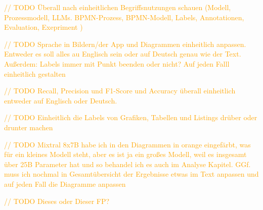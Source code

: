 \textcolor{orange}{// TODO Überall nach einheitlichen Begriffsnutzungen schauen (Modell, Prozessmodell, LLMs. BPMN-Prozess, BPMN-Modell, Labels, Annotationen, Evaluation, Exepriment )}

\textcolor{orange}{// TODO Sprache in Bildern/der App und Diagrammen einheitlich anpassen. Entweder es soll alles au Englisch sein oder auf Deutsch genau wie der Text. Außerdem: Labels immer mit Punkt beenden oder nicht? Auf jeden Falll einheitlich gestalten}

\textcolor{orange}{// TODO Recall, Precision und F1-Score und Accuracy überall einheitlich entweder auf Englisch oder Deutsch.}

\textcolor{orange}{// TODO Einheitlich die Labels von Grafiken, Tabellen und Listings drüber oder drunter machen}

\textcolor{orange}{// TODO Mixtral 8x7B habe ich in den Diagrammen in orange eingefärbt, was für ein kleines Modell steht, aber es ist ja ein großes Modell, weil es insgesamt über 25B Parameter hat und so behandel ich es auch im Analyse Kapitel. GGf. muss ich nochmal in Gesamtübersicht der Ergebnisse etwas im Text anpassen und auf jeden Fall die Diagramme anpassen}

\textcolor{orange}{// TODO Dieses oder Dieser FP?}













